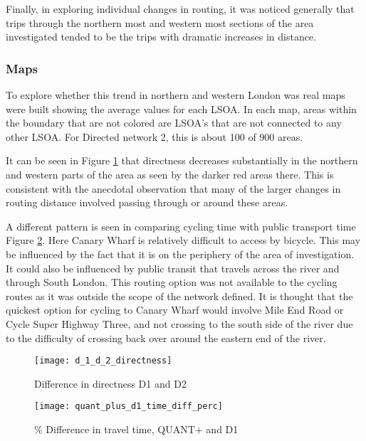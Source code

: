 Finally, in exploring individual changes in routing, it was noticed generally that trips through the northern most and western most sections of the area investigated tended to be the trips with dramatic increases in distance. 

\subsubsection{Maps}

To explore whether this trend in northern and western London was real maps were built showing the average values for each LSOA. In each map, areas within the boundary that are not colored are LSOA's that are not connected to any other LSOA. For Directed network 2, this is about 100 of 900 areas.  

It can be seen in Figure \ref{fig:d1_d2_directness} that directness decreases substantially in the northern and western parts of the area as seen by the darker red areas there. This is consistent with the anecdotal observation that many of the larger changes in routing distance involved passing through or around these areas. 

A different pattern is seen in comparing cycling time with public transport time Figure \ref{fig:quant_d1_time}. Here Canary Wharf is relatively difficult to access by bicycle. This may be influenced by the fact that it is on the periphery of the area of investigation. It could also be influenced by public transit that travels across the river and through South London. This routing option was not available to the cycling routes as it was outside the scope of the network defined. It is thought that the quickest option for cycling to Canary Wharf would involve Mile End Road or Cycle Super Highway Three, and not crossing to the south side of the river due to the difficulty of crossing back over around the eastern end of the river. 



\begin{figure}
\centering
\texttt{[image: d\_1\_d\_2\_directness]}
\caption{Difference in directness D1 and D2}
\label{fig:d1_d2_directness}
\end{figure}

\begin{figure}
\centering
\texttt{[image: quant\_plus\_d1\_time\_diff\_perc]}
\caption{\% Difference in travel time, QUANT+ and D1}
\label{fig:quant_d1_time}
\end{figure}

